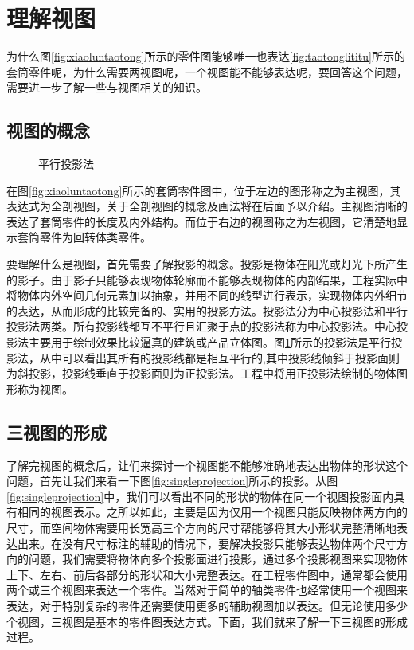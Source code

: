 \section{理解视图}
为什么图\ref{fig:xiaoluntaotong}所示的零件图能够唯一也表达\ref{fig:taotonglititu}所示的套筒零件呢，为什么需要两视图呢，一个视图能不能够表达呢，要回答这个问题，需要进一步了解一些与视图相关的知识。
\subsection{视图的概念}
\begin{figure}[htbp]
\centering
{}\hspace{30pt}
\caption{平行投影法}\label{pingxingtouyin}
\end{figure}

 在图\ref{fig:xiaoluntaotong}所示的套筒零件图中，位于左边的图形称之为主视图，其表达式为全剖视图，关于全剖视图的概念及画法将在后面予以介绍。主视图清晰的表达了套筒零件的长度及内外结构。而位于右边的视图称之为左视图，它清楚地显示套筒零件为回转体类零件。

要理解什么是视图，首先需要了解投影的概念。投影是物体在阳光或灯光下所产生的影子。由于影子只能够表现物体轮廓而不能够表现物体的内部结果，工程实际中将物体内外空间几何元素加以抽象，并用不同的线型进行表示，实现物体内外细节的表达，从而形成的比较完备的、实用的投影方法。投影法分为中心投影法和平行投影法两类。所有投影线都互不平行且汇聚于点的投影法称为中心投影法。中心投影法主要用于绘制效果比较逼真的建筑或产品立体图。图\ref{pingxingtouyin}所示的投影法是平行投影法，从中可以看出其所有的投影线都是相互平行的,其中投影线倾斜于投影面则为斜投影，投影线垂直于投影面则为正投影法。工程中将用正投影法绘制的物体图形称为视图。

\subsection{三视图的形成}
了解完视图的概念后，让们来探讨一个视图能不能够准确地表达出物体的形状这个问题，首先让我们来看一下图\ref{fig:singleprojection}所示的投影。从图\ref{fig:singleprojection}中，我们可以看出不同的形状的物体在同一个视图投影面内具有相同的视图表示。之所以如此，主要是因为仅用一个视图只能反映物体两方向的尺寸，而空间物体需要用长宽高三个方向的尺寸帮能够将其大小形状完整清晰地表达出来。在没有尺寸标注的辅助的情况下，要解决投影只能够表达物体两个尺寸方向的问题，我们需要将物体向多个投影面进行投影，通过多个投影视图来实现物体上下、左右、前后各部分的形状和大小完整表达。在工程零件图中，通常都会使用两个或三个视图来表达一个零件。当然对于简单的轴类零件也经常使用一个视图来表达，对于特别复杂的零件还需要使用更多的辅助视图加以表达。但无论使用多少个视图，三视图是基本的零件图表达方式。下面，我们就来了解一下三视图的形成过程。

